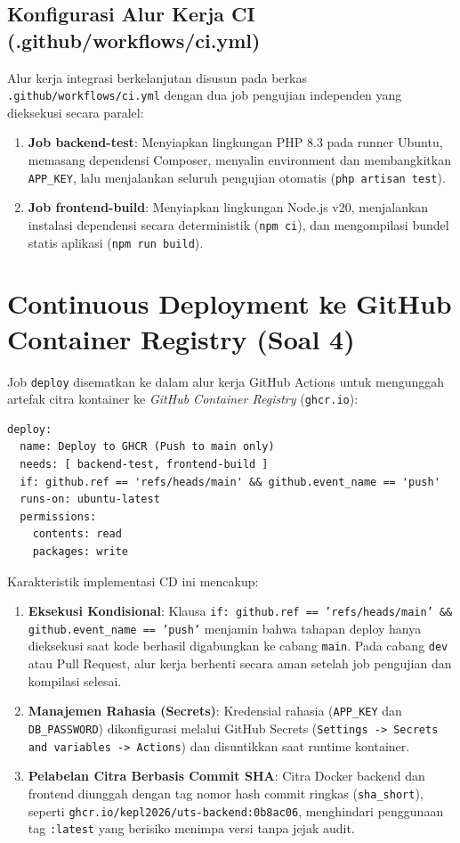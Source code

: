 \documentclass[a4paper,oneside,11pt]{book}
\begin{document}
\subsection{Konfigurasi Alur Kerja CI (.github/workflows/ci.yml)}
Alur kerja integrasi berkelanjutan disusun pada berkas \texttt{.github/workflows/ci.yml} dengan dua job pengujian independen yang dieksekusi secara paralel:
\begin{enumerate}
\item \textbf{Job backend-test}: Menyiapkan lingkungan PHP 8.3 pada runner Ubuntu, memasang dependensi Composer, menyalin environment dan membangkitkan \texttt{APP\_KEY}, lalu menjalankan seluruh pengujian otomatis (\texttt{php artisan test}).
\item \textbf{Job frontend-build}: Menyiapkan lingkungan Node.js v20, menjalankan instalasi dependensi secara deterministik (\texttt{npm ci}), dan mengompilasi bundel statis aplikasi (\texttt{npm run build}).
\end{enumerate}

\section{Continuous Deployment ke GitHub Container Registry (Soal 4)}
Job \texttt{deploy} disematkan ke dalam alur kerja GitHub Actions untuk mengunggah artefak citra kontainer ke \textit{GitHub Container Registry} (\texttt{ghcr.io}):
\begin{lstlisting}[style=codestyle]
deploy:
  name: Deploy to GHCR (Push to main only)
  needs: [ backend-test, frontend-build ]
  if: github.ref == 'refs/heads/main' && github.event_name == 'push'
  runs-on: ubuntu-latest
  permissions:
    contents: read
    packages: write
\end{lstlisting}

Karakteristik implementasi CD ini mencakup:
\begin{enumerate}
\item \textbf{Eksekusi Kondisional}: Klausa \texttt{if: github.ref == 'refs/heads/main' \&\& github.event\_name == 'push'} menjamin bahwa tahapan deploy hanya dieksekusi saat kode berhasil digabungkan ke cabang \texttt{main}. Pada cabang \texttt{dev} atau Pull Request, alur kerja berhenti secara aman setelah job pengujian dan kompilasi selesai.
\item \textbf{Manajemen Rahasia (Secrets)}: Kredensial rahasia (\texttt{APP\_KEY} dan \texttt{DB\_PASSWORD}) dikonfigurasi melalui GitHub Secrets (\texttt{Settings -> Secrets and variables -> Actions}) dan disuntikkan saat runtime kontainer.
\item \textbf{Pelabelan Citra Berbasis Commit SHA}: Citra Docker backend dan frontend diunggah dengan tag nomor hash commit ringkas (\texttt{sha\_short}), seperti \texttt{ghcr.io/kepl2026/uts-backend:0b8ac06}, menghindari penggunaan tag \texttt{:latest} yang berisiko menimpa versi tanpa jejak audit.
\end{enumerate}
\end{document}
